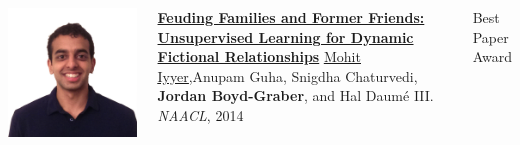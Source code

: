 \documentclass[compress]{beamer}
\begin{document}
\begin{frame}{}

  \begin{columns}
        \includegraphics[width=0.7\linewidth]{general_figures/mohit}
        \begin{block}{ {\bf \href{http://cs.colorado.edu/~jbg//docs/2014_emnlp_qb_rnn.pdf}{Feuding Families and Former Friends: Unsupervised Learning for Dynamic Fictional Relationships}}}
\underline{\href{http://cs.umd.edu/~miyyer/}{Mohit Iyyer}},Anupam Guha, Snigdha Chaturvedi, {\bf Jordan Boyd-Graber}, and Hal {Daum\'{e} III}.  \emph{NAACL}, 2014
        \end{block}
Best Paper Award
  \end{columns}
\end{frame}
\end{document}
